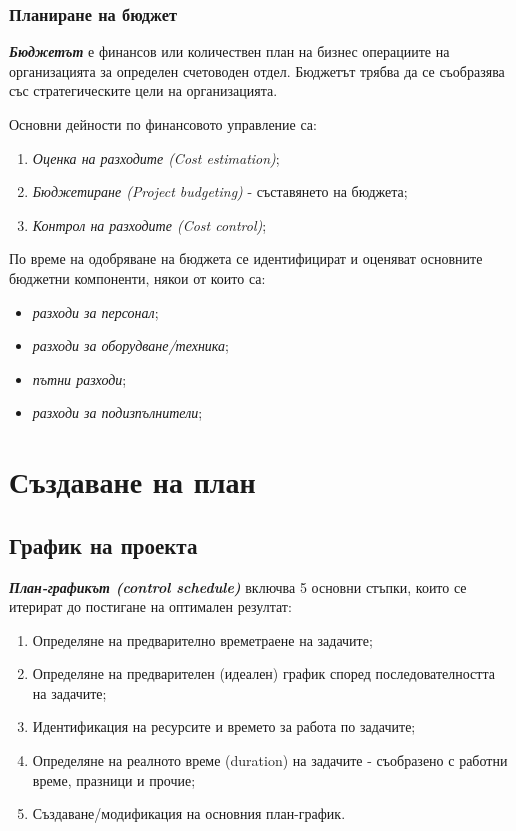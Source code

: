\documentclass[fleqn,12pt]{article}
\begin{document}
\subsubsection{Планиране на бюджет}

\textbf{\textit{Бюджетът}} е финансов или количествен план на бизнес операциите на организацията за определен счетоводен отдел.
Бюджетът трябва да се съобразява със стратегическите цели на организацията.

Основни дейности по финансовото управление са:
\begin{enumerate}
    \item \textit{Оценка на разходите (Cost estimation)};
    \item \textit{Бюджетиране (Project budgeting)} - съставянето на бюджета;
    \item \textit{Контрол на разходите (Cost control)};
\end{enumerate}

По време на одобряване на бюджета се идентифицират и оценяват основните бюджетни компоненти, някои от които са:
\begin{itemize}
    \item \textit{разходи за персонал};
    \item \textit{разходи за оборудване/техника};
    \item \textit{пътни разходи};
    \item \textit{разходи за подизпълнители};
\end{itemize}

\section{Създаване на план}

\subsection{График на проекта}

\textbf{\textit{План-графикът (control schedule)}} включва 5 основни стъпки, които се итерират до постигане на оптимален резултат:

\begin{enumerate}
    \item Определяне на предварително времетраене на задачите;
    \item Определяне на предварителен (идеален) график според последователността на задачите;
    \item Идентификация на ресурсите и времето за работа по задачите;
    \item Определяне на реалното време (duration) на задачите - съобразено с работни време, празници и прочие;
    \item Създаване/модификация на основния план-график.
\end{enumerate}
\end{document}
